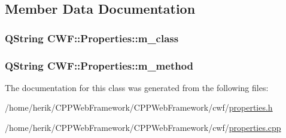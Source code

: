 \subsection{Member Data Documentation}
\hypertarget{class_c_w_f_1_1_properties_ad77aa99c8e2ea4afe6300d739ba22308}{
\subsubsection[{m\+\_\+class}]{\setlength{\rightskip}{0pt plus 5cm}Q\+String C\+W\+F\+::\+Properties\+::m\+\_\+class}}\label{class_c_w_f_1_1_properties_ad77aa99c8e2ea4afe6300d739ba22308}
\hypertarget{class_c_w_f_1_1_properties_a70682c472acdeef56e50a79f2436833e}{
\subsubsection[{m\+\_\+method}]{\setlength{\rightskip}{0pt plus 5cm}Q\+String C\+W\+F\+::\+Properties\+::m\+\_\+method}}\label{class_c_w_f_1_1_properties_a70682c472acdeef56e50a79f2436833e}


The documentation for this class was generated from the following files\+:\begin{DoxyCompactItemize}
\item 
/home/herik/\+C\+P\+P\+Web\+Framework/\+C\+P\+P\+Web\+Framework/cwf/\hyperlink{properties_8h}{properties.\+h}\item 
/home/herik/\+C\+P\+P\+Web\+Framework/\+C\+P\+P\+Web\+Framework/cwf/\hyperlink{properties_8cpp}{properties.\+cpp}\end{DoxyCompactItemize}
